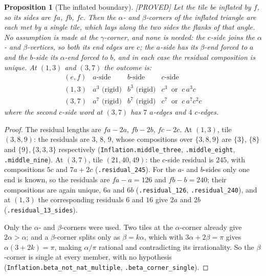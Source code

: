 \documentclass[11pt,reqno]{amsart}
\theoremstyle{plain}
\newtheorem{proposition}[theorem]{Proposition}
\theoremstyle{definition}
\newcommand{\lab}[1]{\hfill\textnormal{\footnotesize\textsc{[#1]}}}
\begin{document}
\begin{proposition}[The inflated boundary]\label{prop:inflbdy}\lab{PROVED}
Let the tile be inflated by $f$, so its sides are $fa$, $fb$, $fc$. Then the $\alpha$- and $\beta$-corners of the inflated triangle are each met by a single
tile, which lays along the two sides the flanks of that angle. No assumption is made at the
$\gamma$-corner, and none is needed: the $c$-side joins the $\alpha$- and $\beta$-vertices, so both its
end edges are $c$; the $a$-side has its $\beta$-end forced to $a$ and the $b$-side its $\alpha$-end
forced to $b$, and in each case the residual composition is unique. At $(1,3)$ and $(3,7)$ the outcome
is:
\[
\begin{array}{llll}
(e,f) & a\text{-side} & b\text{-side} & c\text{-side}\\\hline
(1,3) & a^3 \text{ (rigid)} & b^3 \text{ (rigid)} & c^3 \ \text{ or }\ c\,a^3c\\
(3,7) & a^7 \text{ (rigid)} & b^7 \text{ (rigid)} & c^7 \ \text{ or }\ c\,a^7c^2c
\end{array}
\]
where the second $c$-side word at $(3,7)$ has $7$ $a$-edges and $4$ $c$-edges.
\end{proposition}

\begin{proof}
The residual lengths are $fa-2a$, $fb-2b$, $fc-2c$. At $(1,3)$, tile $(3,8,9)$: the residuals are
$3$, $8$, $9$, whose compositions over $\{3,8,9\}$ are $\{3\}$, $\{8\}$ and $\{9\},\{3,3,3\}$
respectively (\texttt{Inflation.middle\_three}, \texttt{.middle\_eight}, \texttt{.middle\_nine}). At
$(3,7)$, tile $(21,40,49)$: the $c$-side residual is $245$, with compositions $5c$ and $7a+2c$
(\texttt{.residual\_245}). For the $a$- and $b$-sides only one end is known, so the residuals are
$fa-a=126$ and $fb-b=240$; their compositions are again unique, $6a$ and $6b$
(\texttt{.residual\_126}, \texttt{.residual\_240}), and at $(1,3)$ the corresponding residuals $6$ and
$16$ give $2a$ and $2b$ (\texttt{.residual\_13\_sides}).

Only the $\alpha$- and $\beta$-corners were used. Two tiles at the $\alpha$-corner already give
$2\alpha>\alpha$; and a $\beta$-corner splits only as $\beta=k\alpha$, which with $3\alpha+2\beta=\pi$
gives $\alpha(3+2k)=\pi$, making $\alpha/\pi$ rational and contradicting its irrationality. So the
$\beta$-corner is single at every member, with no hypothesis
(\texttt{Inflation.beta\_not\_nat\_multiple}, \texttt{.beta\_corner\_single}).
\end{proof}
\end{document}

